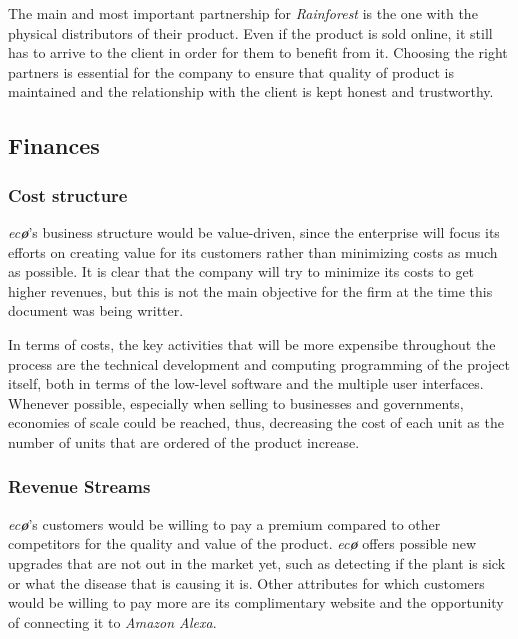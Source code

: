 \documentclass[english,runningheads,a4paper]{llncs}[2018/03/10]
\begin{document}
        The main and most important partnership for \textit{Rainforest} is the
        one with the physical distributors of their product. Even if the product
        is sold online, it still has to arrive to the client in order for them
        to benefit from it. Choosing the right partners is essential for the
        company to ensure that quality of product is maintained and the
        relationship with the client is kept honest and trustworthy.
    

    \subsection*{Finances}

        \subsubsection*{Cost structure}

        \textit{ec\textbf{\o}}'s business structure would be value-driven, since
        the enterprise will focus its efforts on creating value for its
        customers rather than minimizing costs as much as possible. It is clear
        that the company will try to minimize its costs to get higher revenues,
        but this is not the main objective for the firm at the time this
        document was being writter.

        In terms of costs, the key activities that will be more expensibe
        throughout the process are the technical development and computing
        programming of the project itself, both in terms of the low-level
        software and the multiple user interfaces. Whenever possible, especially
        when selling to businesses and governments, economies of scale could be
        reached, thus, decreasing the cost of each unit as the number of units
        that are ordered of the product increase.


        \subsubsection*{Revenue Streams}

        \textit{ec\textbf{\o}}'s customers would be willing to pay a premium
        compared to other competitors for the quality and value of the product.
        \textit{ec\textbf{\o}} offers possible new upgrades that are not out in
        the market yet, such as detecting if the plant is sick or what the
        disease that is causing it is. Other attributes for which customers
        would be willing to pay more are its complimentary website and the
        opportunity of connecting it to \textit{Amazon Alexa}.
\end{document}
